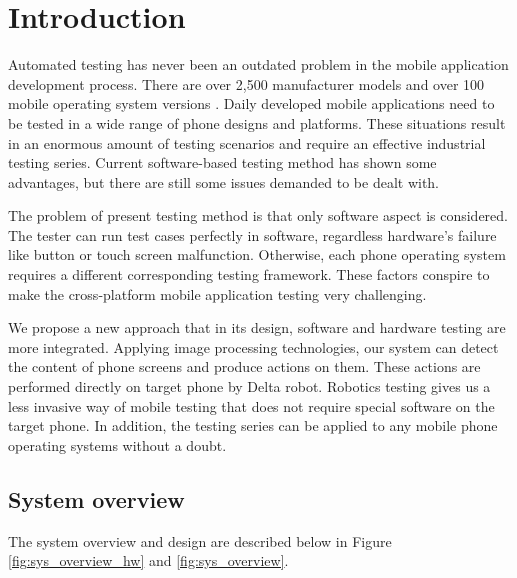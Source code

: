 \chapter{Introduction}

Automated testing has never been an outdated problem in the mobile application development process. There are over 2,500 manufacturer models and over 100 mobile operating system versions \cite{crittercism}. Daily developed mobile applications need to be tested in a wide range of phone designs and platforms. These situations result in an enormous amount of testing scenarios and require an effective industrial testing series. Current software-based testing method has shown some advantages, but there are still some issues demanded to be dealt with.

The problem of present testing method is that only software aspect is considered. The tester can run test cases perfectly in software, regardless hardware's failure like button or touch screen malfunction. Otherwise, each phone operating system requires a different corresponding testing framework. These factors conspire to make the cross-platform mobile application testing very challenging. \nocite{weinman_thesis}

We propose a new approach that in its design, software and hardware testing are more integrated. Applying image processing technologies, our system can detect the content of phone screens and produce actions on them. These actions are performed directly on target phone by Delta robot. Robotics testing gives us a less invasive way of mobile testing that does not require special software on the target phone. In addition, the testing series can be applied to any mobile phone operating systems without a doubt.

\section{System overview}
The system overview and design are described below in Figure \ref{fig:sys_overview_hw} and \ref{fig:sys_overview}.

